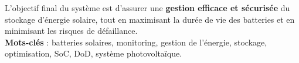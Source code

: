 L'objectif final du système est d'assurer une \textbf{gestion efficace et sécurisée} du stockage d'énergie solaire, tout en maximisant la durée de vie des batteries et en minimisant les risques de défaillance.\\

\textbf{Mots-clés} : batteries solaires, monitoring, gestion de l'énergie, stockage, optimisation, SoC, DoD, système photovoltaïque.
